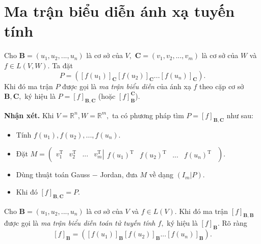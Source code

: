 \section{Ma trận biểu diễn ánh xạ tuyến tính}
Cho $\mathbf{B} = \left( {u_1, u_2, ..., u_n} \right)$ là cơ sở của $V,$  
$\mathbf{C} = \left( {v_1, v_2, ..., v_m} \right)$ là cơ sở của $W$ và $f \in L \left( {V, W} \right).$ Ta đặt
$$P = \left( {{{\left[ {f\left( {{u_1}} \right)} \right]}_{\mathbf{C}}}{{\left[ {f\left( {{u_2}} \right)} \right]}_{\mathbf{C}}}...{{\left[ {f\left( {{u_n}} \right)} \right]}_{\mathbf{C}}}} \right).$$
Khi đó ma trận $P$ được gọi là \textit{ma trận biểu diễn} của ánh xạ $f$ theo cặp cơ sở $\mathbf{B}, \mathbf{C},$ ký hiệu là $P = {\left[ f \right]_{\mathbf{B},\mathbf{C}}}$ (hoặc $\left[ f \right]_{\mathbf{B}}^{\mathbf{C}}$).
\begin{mybox}
\textbf{Nhận xét.} Khi $V = \mathbb{R}^n, W = \mathbb{R}^m,$ ta có phương pháp tìm $P = {\left[ f \right]_{\mathbf{B},\mathbf{C}}}$ như sau:
\begin{itemize}
\item Tính $f\left( {{u_1}} \right),f\left( {{u_2}} \right),...,f\left( {{u_n}} \right).$
\item Đặt $M = \left( {\begin{array}{*{20}{c}}
  {v_1^{\mathrm{T}}}&{v_2^{\mathrm{T}}}&{...}&{\left. {v_m^{\mathrm{T}}} \right|\begin{array}{*{20}{c}}
  {f{{\left( {{u_1}} \right)}^{\mathrm{T}}}}&{f{{\left( {{u_2}} \right)}^{\mathrm{T}}}}&{...}&{f{{\left( {{u_n}} \right)}^{\mathrm{T}}}} 
\end{array}} 
\end{array}} \right).$
\item Dùng thuật toán Gauss $-$ Jordan, đưa $M$ về dạng $\left( {\left. {{I_m}} \right|P} \right).$
\item Khi đó $\left[ f \right]_{\mathbf{B},\mathbf{C}} = P.$
\end{itemize}
\end{mybox}
Cho $\mathbf{B} = \left( {u_1, u_2, ..., u_n} \right)$ là cơ sở của $V$ và $f \in L \left( V \right).$ Khi đó ma trận $\left[ f \right]_{\mathbf{B},\mathbf{B}}$ được gọi là \textit{ma trận biểu diễn toán tử tuyến tính $f,$} ký hiệu là $\left[ f \right]_{\mathbf{B}}.$ Rõ ràng
$$\left[ f \right]_{\mathbf{B}} = \left( {{{\left[ {f\left( {{u_1}} \right)} \right]}_{\mathbf{B}}}{{\left[ {f\left( {{u_2}} \right)} \right]}_{\mathbf{B}}}...{{\left[ {f\left( {{u_n}} \right)} \right]}_{\mathbf{B}}}} \right).$$
